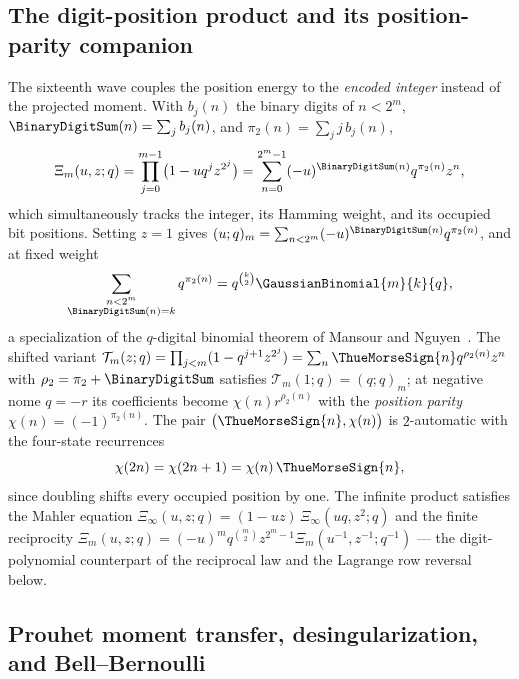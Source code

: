 \documentclass[11pt,oneside]{article}
\numberwithin{equation}{section}
\theoremstyle{definition}
\theoremstyle{remark}
\begin{document}
\subsection{The digit-position product and its position-parity companion}

The sixteenth wave couples the position energy to the \emph{encoded integer}
instead of the projected moment.  With $b_j(n)$ the binary digits of
$n<2^m$, $\BinaryDigitSum(n)=\sum_jb_j(n)$, and $\pi_2(n)=\sum_jj\,b_j(n)$,
\begin{equation}\label{p7:eq:digit-master}
 \Xi_m(u,z;q)=\prod_{j=0}^{m-1}\bigl(1-uq^jz^{2^j}\bigr)
 =\sum_{n=0}^{2^m-1}(-u)^{\BinaryDigitSum(n)}q^{\pi_2(n)}z^n,
\end{equation}
which simultaneously tracks the integer, its Hamming weight, and its occupied
bit positions.  Setting $z=1$ gives
$(u;q)_m=\sum_{n<2^m}(-u)^{\BinaryDigitSum(n)}q^{\pi_2(n)}$, and at fixed weight
\begin{equation}\label{p7:eq:fixed-weight}
 \sum_{\substack{n<2^m\\ \BinaryDigitSum(n)=k}}q^{\pi_2(n)}
 =q^{\binom k2}\GaussianBinomial{m}{k}{q},
\end{equation}
a specialization of the $q$-digital binomial theorem of Mansour and
Nguyen~\cite{p7:mansour-nguyen}.  The shifted variant
$\mathcal T_m(z;q)=\prod_{j<m}(1-q^{j+1}z^{2^j})
=\sum_n\ThueMorseSign{n}q^{\rho_2(n)}z^n$ with
$\rho_2=\pi_2+\BinaryDigitSum$ satisfies
$\mathcal T_m(1;q)=(q;q)_m$; at negative nome $q=-r$ its coefficients become
$\chi(n)r^{\rho_2(n)}$ with the \emph{position parity}
$\chi(n)=(-1)^{\pi_2(n)}$.  The pair
$\bigl(\ThueMorseSign{n},\chi(n)\bigr)$ is $2$-automatic with the four-state
recurrences
\begin{equation}\label{p7:eq:four-state}
 \chi(2n)=\chi(2n+1)=\chi(n)\,\ThueMorseSign{n},
\end{equation}
since doubling shifts every occupied position by one.  The infinite product
satisfies the Mahler equation
$\Xi_\infty(u,z;q)=(1-uz)\,\Xi_\infty(uq,z^2;q)$ and the finite reciprocity
$\Xi_m(u,z;q)=(-u)^mq^{\binom m2}z^{2^m-1}\Xi_m(u^{-1},z^{-1};q^{-1})$ ---
the digit-polynomial counterpart of the reciprocal law and the Lagrange row
reversal below.

\subsection{Prouhet moment transfer, desingularization, and Bell--Bernoulli}
\end{document}
